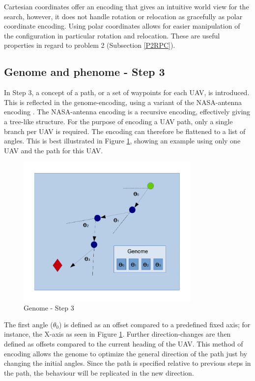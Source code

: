\documentclass[10pt,a4paper]{book}
\begin{document}
Cartesian coordinates offer an encoding that gives an intuitive world view for the search, however, it does not handle rotation or relocation as gracefully as polar coordinate encoding. Using polar coordinates allows for easier manipulation of the configuration in particular rotation and relocation. These are useful properties in regard to problem 2 (Subsection \ref{P2RPC}).


\subsection{Genome and phenome - Step 3}
\label{EAGENOMEPATH}

In Step 3, a concept of a path, or a set of waypoints for each \gls{UAV}, is introduced. This is reflected in the genome-encoding, using a variant of the NASA-antenna encoding \cite{hornby2006automated}. The NASA-antenna encoding is a recursive encoding, effectively giving a tree-like structure. For the purpose of encoding a \gls{UAV} path, only a single branch per \gls{UAV} is required. The encoding can therefore be flattened to a list of angles. This is best illustrated in Figure \ref{genomestep3}, showing an example using only one \gls{UAV} and the path for this \gls{UAV}. 

\begin{figure}[htp]
\centering
\includegraphics[width=90mm]{eaencodingstep3.pdf}
\caption{Genome - Step 3}
\label{genomestep3}
\end{figure}

The first angle ($\theta_0$) is defined as an offset compared to a predefined fixed axis; for instance, the X-axis as seen in Figure \ref{genomestep3}. Further direction-changes are then defined as offsets compared to the current heading of the \gls{UAV}. This method of encoding allows the genome to optimize the general direction of the path just by changing the initial angles. Since the path is specified relative to previous steps in the path, the behaviour will be replicated in the new direction. 
\end{document}
